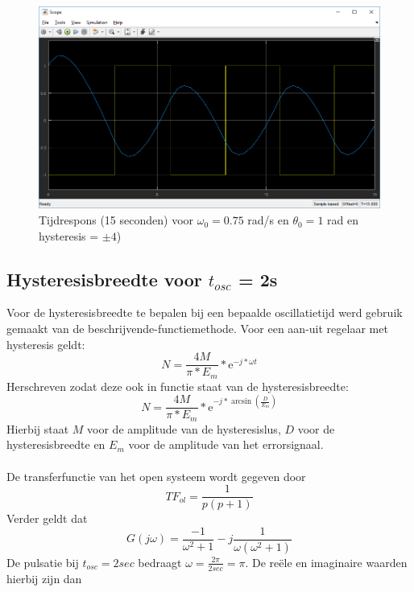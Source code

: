 \documentclass[12pt]{article}
\begin{document}
\begin{figure}[]
	\centering
	\includegraphics[width=\textwidth, keepaspectratio]{output2.png}
	\caption{Tijdrespons (15 seconden) voor $\omega_0 = 0.75$ rad/s en $\theta_0 = 1$ rad en hysteresis = $\pm 4$)}
	\label{output2}
\end{figure}
\clearpage
\subsection{Hysteresisbreedte voor $t_{osc}$ = 2s}
Voor de hysteresisbreedte te bepalen bij een bepaalde oscillatietijd werd gebruik gemaakt van de beschrijvende-functiemethode. Voor een aan-uit regelaar met hysteresis geldt:
\begin{equation}
	N = \frac{4M}{\pi * E_m} * \mathrm{e}^{-j*\omega t}
\end{equation}
Herschreven zodat deze ook in functie staat van de hysteresisbreedte:
\begin{equation}
	N = \frac{4M}{\pi * E_m} * \mathrm{e}^{-j*\arcsin(\frac{D}{E_m})}
	\label{hbreedte}
\end{equation} 
Hierbij staat $M$ voor de amplitude van de hysteresislus, $D$ voor de hysteresisbreedte en $E_m$ voor de amplitude van het errorsignaal. \\ \\
De transferfunctie van het open systeem wordt gegeven door
\begin{equation}
	TF_{ol} = \frac{1}{p(p+1)}
\end{equation}
Verder geldt dat
\begin{equation}
	G(j\omega) = \frac{-1}{\omega^2+1} -j\frac{1}{\omega(\omega^2+1)}
	\label{gjomega}
\end{equation}
De pulsatie bij $t_{osc} = 2sec$ bedraagt $\omega = \frac{2\pi}{2sec} = \pi$. De reële en imaginaire waarden hierbij zijn dan
\end{document}
